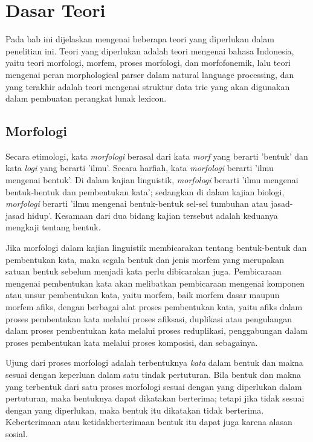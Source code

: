 \chapter{Dasar Teori}
\label{chap:dasarTeori}

Pada bab ini dijelaskan mengenai beberapa teori yang diperlukan dalam penelitian ini. Teori yang diperlukan adalah teori mengenai bahasa Indonesia, yaitu teori morfologi, morfem, proses morfologi, dan morfofonemik, lalu teori mengenai peran morphological parser dalam natural language processing, dan yang terakhir adalah teori mengenai struktur data trie yang akan digunakan dalam pembuatan perangkat lunak lexicon.

\section{Morfologi}
\label{sec:morfologi}

Secara etimologi, kata \textit{morfologi} berasal dari kata \textit{morf} yang berarti 'bentuk' dan kata \textit{logi} yang berarti 'ilmu'\cite{chaer:08:morfologi}. Secara harfiah, kata \textit{morfologi} berarti 'ilmu mengenai bentuk'. Di dalam kajian linguistik, \textit{morfologi} berarti 'ilmu mengenai bentuk-bentuk dan pembentukan kata'; sedangkan di dalam kajian biologi, \textit{morfologi} berarti 'ilmu mengenai bentuk-bentuk sel-sel tumbuhan atau jasad-jasad hidup'. Kesamaan dari dua bidang kajian tersebut adalah keduanya mengkaji tentang bentuk. 

Jika morfologi dalam kajian linguistik membicarakan tentang bentuk-bentuk dan pembentukan kata, maka segala bentuk dan jenis morfem yang merupakan satuan bentuk sebelum menjadi kata perlu dibicarakan juga. Pembicaraan mengenai pembentukan kata akan melibatkan pembicaraan mengenai komponen atau unsur pembentukan kata, yaitu morfem, baik morfem dasar maupun morfem afiks, dengan berbagai alat proses pembentukan kata, yaitu afiks dalam proses pembentukan kata melalui proses afiksasi, duplikasi atau pengulangan dalam proses pembentukan kata melalui proses reduplikasi, penggabungan dalam proses pembentukan kata melalui proses komposisi, dan sebagainya. 

Ujung dari proses morfologi adalah terbentuknya \textit{kata} dalam bentuk dan makna sesuai dengan keperluan dalam satu tindak pertuturan. Bila bentuk dan makna yang terbentuk dari satu proses morfologi sesuai dengan yang diperlukan dalam pertuturan, maka bentuknya dapat dikatakan berterima; tetapi jika tidak sesuai dengan yang diperlukan, maka bentuk itu dikatakan tidak berterima. Keberterimaan atau ketidakberterimaan bentuk itu dapat juga karena alasan sosial.


